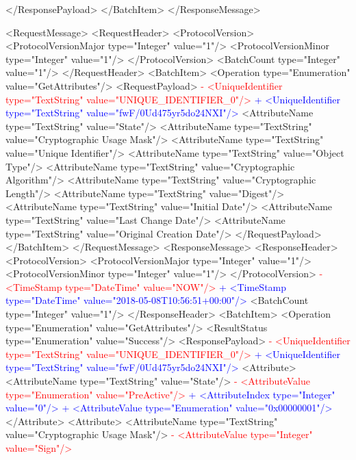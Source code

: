      </ResponsePayload>
   </BatchItem>
 </ResponseMessage>
 
 \newpage
 <RequestMessage>
   <RequestHeader>
     <ProtocolVersion>
       <ProtocolVersionMajor type="Integer" value="1"/>
       <ProtocolVersionMinor type="Integer" value="1"/>
     </ProtocolVersion>
     <BatchCount type="Integer" value="1"/>
   </RequestHeader>
   <BatchItem>
     <Operation type="Enumeration" value="GetAttributes"/>
     <RequestPayload>
\textcolor{red}{-      <UniqueIdentifier type="TextString" value="UNIQUE_IDENTIFIER_0"/>}
\textcolor{blue}{+      <UniqueIdentifier type="TextString" value="fwF/0Ud475yr5do24NXI"/>}
       <AttributeName type="TextString" value="State"/>
       <AttributeName type="TextString" value="Cryptographic Usage Mask"/>
       <AttributeName type="TextString" value="Unique Identifier"/>
       <AttributeName type="TextString" value="Object Type"/>
       <AttributeName type="TextString" value="Cryptographic Algorithm"/>
       <AttributeName type="TextString" value="Cryptographic Length"/>
       <AttributeName type="TextString" value="Digest"/>
       <AttributeName type="TextString" value="Initial Date"/>
       <AttributeName type="TextString" value="Last Change Date"/>
       <AttributeName type="TextString" value="Original Creation Date"/>
     </RequestPayload>
   </BatchItem>
 </RequestMessage>
 <ResponseMessage>
   <ResponseHeader>
     <ProtocolVersion>
       <ProtocolVersionMajor type="Integer" value="1"/>
       <ProtocolVersionMinor type="Integer" value="1"/>
     </ProtocolVersion>
\textcolor{red}{-    <TimeStamp type="DateTime" value="NOW"/>}
\textcolor{blue}{+    <TimeStamp type="DateTime" value="2018-05-08T10:56:51+00:00"/>}
     <BatchCount type="Integer" value="1"/>
   </ResponseHeader>
   <BatchItem>
     <Operation type="Enumeration" value="GetAttributes"/>
     <ResultStatus type="Enumeration" value="Success"/>
     <ResponsePayload>
\textcolor{red}{-      <UniqueIdentifier type="TextString" value="UNIQUE_IDENTIFIER_0"/>}
\textcolor{blue}{+      <UniqueIdentifier type="TextString" value="fwF/0Ud475yr5do24NXI"/>}
       <Attribute>
         <AttributeName type="TextString" value="State"/>
\textcolor{red}{-        <AttributeValue type="Enumeration" value="PreActive"/>}
\textcolor{blue}{+        <AttributeIndex type="Integer" value="0"/>}
\textcolor{blue}{+        <AttributeValue type="Enumeration" value="0x00000001"/>}
       </Attribute>
       <Attribute>
         <AttributeName type="TextString" value="Cryptographic Usage Mask"/>
\textcolor{red}{-        <AttributeValue type="Integer" value="Sign"/>}
